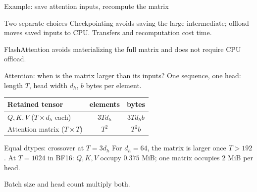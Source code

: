 \documentclass[handout]{beamer}
\begin{document}
\begin{frame}{Example: save attention inputs, recompute the matrix}
  \centering
  \par\vspace{4pt}
  \begin{block}{Two separate choices}
    Checkpointing avoids saving the large intermediate; offload moves saved inputs to CPU. Transfers and recomputation cost time.
  \end{block}
  \footnotesize FlashAttention avoids materializing the full matrix and does not require CPU offload.
\end{frame}

\begin{frame}{Attention: when is the matrix larger than its inputs?}
  \small One sequence, one head: length $T$, head width $d_h$, $b$ bytes per element.
  \vspace{5pt}
  \begin{center}
    \begin{tabular}{@{}lcc@{}}
      \toprule
      Retained tensor & elements & bytes \\
      \midrule
      $Q,K,V$ ($T\times d_h$ each) & $3Td_h$ & $3Td_hb$ \\
      Attention matrix ($T\times T$) & $T^2$ & $T^2b$ \\
      \bottomrule
    \end{tabular}
  \end{center}
  \begin{block}{Equal dtypes: crossover at $T=3d_h$}
    For $d_h=64$, the matrix is larger once $T>192$. At $T=1024$ in BF16: $Q,K,V$ occupy $0.375$ MiB; one matrix occupies $2$ MiB per head.
  \end{block}
  \footnotesize Batch size and head count multiply both.
\end{frame}
\end{document}

